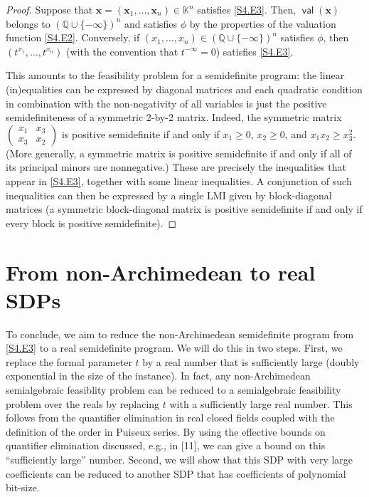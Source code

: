\documentclass[10pt,a4paper]{article}
\theoremstyle{definition}
\begin{document}
\begin{proof}
Suppose that $\bm{x}=(\bm{x}_{1},\dots,\bm{x}_{n})\in\mathbb{K}^{n}$ satisfies \eqref{S4.E3}. Then, $\operatorname*{\mathsf{val}}(\bm{x})$ belongs to $(\mathbb{Q}\cup\{-\infty\})^{n}$ and satisfies $\phi$ by the properties of the valuation function \eqref{S4.E2}. Conversely, if $(x_{1},\dots,x_{n})\in(\mathbb{Q}\cup\{-\infty\})^{n}$ satisfies $\phi$, then $(t^{x_{1}},\dots,t^{x_{n}})$ (with the convention that $t^{-\infty}=0$) satisfies \eqref{S4.E3}.

This amounts to the feasibility problem for a semidefinite program: the linear (in)equalities can be expressed by diagonal matrices and each quadratic condition in combination with the non-negativity of all variables is just the positive semidefiniteness of a symmetric 2-by-2 matrix. Indeed, the symmetric matrix $\begin{pmatrix}x_{1}&x_{3}\\ x_{3}&x_{2}\end{pmatrix}$ is positive semidefinite if and only if $x_{1}\geq 0$, $x_{2}\geq 0$, and $x_{1}x_{2}\geq x_{3}^{2}$. (More generally, a symmetric matrix is positive semidefinite if and only if all of its principal minors are nonnegative.) These are precisely the inequalities that appear in \eqref{S4.E3}, together with some linear inequalities. A conjunction of such inequalities can then be expressed by a single LMI given by block-diagonal matrices (a symmetric block-diagonal matrix is positive semidefinite if and only if every block is positive semidefinite). 

\end{proof}

\section*{From non-Archimedean to real SDPs}

To conclude, we aim to reduce the non-Archimedean semidefinite program from \eqref{S4.E3} to a real semidefinite program. We will do this in two steps. First, we replace the formal parameter $t$ by a real number that is sufficiently large (doubly exponential in the size of the instance). In fact, any non-Archimedean semialgebraic feasiblity problem can be reduced to a semialgebraic feasibility problem over the reals by replacing $t$ with a sufficiently large real number. This follows from the quantifier elimination in real closed fields coupled with the definition of the order in Puiseux series. By using the effective bounds on quantifier elimination discussed, e.g., in [11], we can give a bound on this “sufficiently large” number. Second, we will show that this SDP with very large coefficients can be reduced to another SDP that has coefficients of polynomial bit-size.
\end{document}

